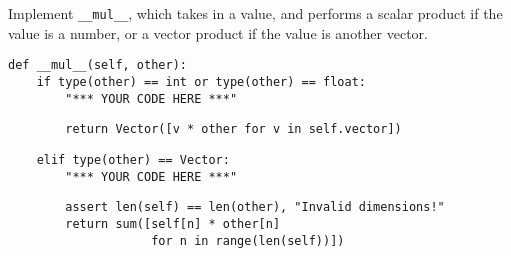 \question Implement {\tt \_\_mul\_\_}, which takes in a value, and
performs a scalar product if the value is a number, or a vector product
if the value is another vector.
\begin{lstlisting}
def __mul__(self, other):
    if type(other) == int or type(other) == float:
        "*** YOUR CODE HERE ***"
\end{lstlisting}

\begin{solution}[3cm]
\begin{lstlisting}
        return Vector([v * other for v in self.vector])
\end{lstlisting}
\end{solution}

\begin{lstlisting}
    elif type(other) == Vector:
        "*** YOUR CODE HERE ***"
\end{lstlisting}

\begin{solution}[3cm]
\begin{lstlisting}
        assert len(self) == len(other), "Invalid dimensions!"
        return sum([self[n] * other[n]
                    for n in range(len(self))])
\end{lstlisting}
\end{solution}

